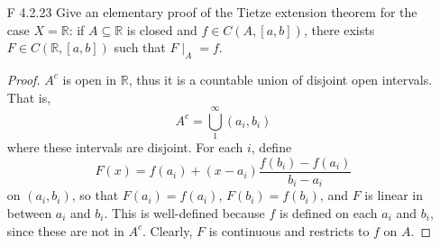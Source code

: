 \documentclass[10pt]{article}
\newcommand{\R}{\mathbb{R}}
\begin{document}
\begin{enumerate}
\item[F 4.2.23] Give an elementary proof of the Tietze extension theorem for the case $X = \R$:
if $A \subseteq \R$ is closed and $f \in C(A, [a,b])$, there exists $F \in C(\R,[a,b])$ such that $F \mid_A = f$.

\begin{proof}
$A^c$ is open in $\R$, thus it is a countable union of disjoint open intervals.  That is,
$$
A^c = \bigcup_1^\infty (a_i,b_i)
$$
where these intervals are disjoint.  For each $i$, define
$$F(x) = f(a_i) + (x-a_i)\frac{f(b_i) - f(a_i)}{b_i-a_i}$$
on $(a_i , b_i)$, so that $F(a_i) = f(a_i)$, $F(b_i) = f(b_i)$, and $F$ is linear in between $a_i$ and $b_i$.  This is well-defined because $f$ is defined on each $a_i$ and $b_i$, since these are not in $A^c$.  Clearly, $F$ is continuous and restricts to $f$ on $A$.
\end{proof}

\end{enumerate}
\end{document}
